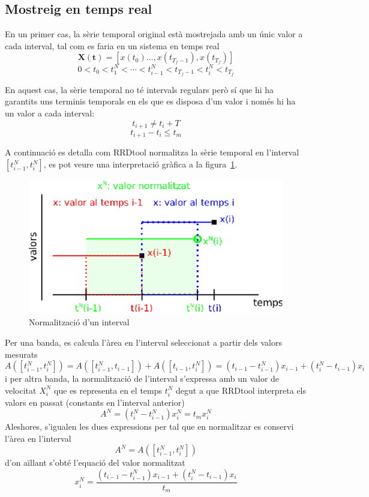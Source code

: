 \subsection{Mostreig en temps real}

En un primer cas, la sèrie temporal original està mostrejada amb un únic valor a cada interval, tal com es faria en un sistema en temps real 
$$
\mathbf{X(t)}= [x(t_0)\ldots,x(t_{T_f-1}),x(t_{T_f})]
$$
$$
0< t_0 < t^N_1 < \cdots <   t^N_{i-1}<t_{T_f-1} < t^N_i < t_{T_f}
$$ 

En aquest cas, la sèrie temporal no té intervals regulars però sí que hi ha garantits uns terminis temporals en els que es disposa d'un valor i només hi ha un valor a cada interval:
$$
t_{i+1}\neq t_{i} + T 
$$
$$
t_{i+1} - t_{i} \leq t_m 
$$

A continuació es detalla com RRDtool normalitza la sèrie temporal en l'interval $[t^N_{i-1},t^N_i]$, es pot veure una interpretació gràfica a la figura~\ref{fig:rrdtool:normalitzacio}.

\begin{figure}[htp]
  \centering
  \includegraphics[width=\textwidth]{imatges/rrdtool/normalitzacio.eps}
  \caption{Normalització d'un interval}
  \label{fig:rrdtool:normalitzacio}
\end{figure}


Per una banda, es calcula l'àrea en l'interval seleccionat a partir dels valors mesurats
\[
A([t^N_{i-1},t^N_i]) = A([t^N_{i-1},t_{i-1}])+A([t_{i-1},t^N_i]) = ( t_{i-1} - t^N_{i-1})x_{i-1} + ( t^N_{i} - t_{i-1} )x_{i}
\]
i per altra banda, la normalització de l'interval s'expressa amb un valor de velocitat $X^N_i$ que es representa en el temps  $t^N_i$ degut a que RRDtool interpreta els valors en passat (constants en l'interval anterior)
\[
A^N = (  t^N_i - t^N_{i-1} )x^N_i  = t_m x^N_i
\]
Aleshores, s'igualen les dues expressions per tal que en normalitzar es conservi l'àrea en l'interval
\[
A^N=A([t^N_{i-1},t^N_i])
\]
d'on aïllant s'obté l'equació del valor normalitzat 
\begin{equation}\label{eq:rrdtool-etapes:normalitza}
x^N_i= \frac{(t_{i-1}-t^N_{i-1})x_{i-1} + (t^N_i-t_{i-1})x_i  }{t_m}
\end{equation}


